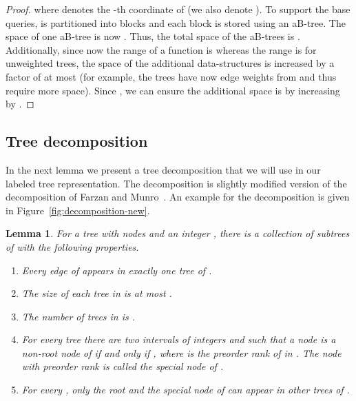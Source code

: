 \documentclass[12pt]{article}
\newtheorem{lemma}[theorem]{Lemma}
\begin{document}
\begin{proof}
where  denotes the -th coordinate of 
(we also denote ).
To support the base queries,  is partitioned into blocks and each block
is stored using an aB-tree.
The space of one aB-tree is now .
Thus, the total space of the aB-trees is .
Additionally, since now the range of a function  is 
whereas the range is  for unweighted trees,
the space of the additional data-structures is increased
by a factor of at most 
(for example, the  trees have now edge weights from 
and thus require more space).
Since , we can ensure the additional space is 
by increasing  by .
\end{proof}

\subsection{Tree decomposition}
In the next lemma we present a tree decomposition that we will use in
our labeled tree representation.
The decomposition is slightly modified version of the decomposition of
Farzan and Munro~\cite{FarzanM08}.
An example for the decomposition is given in Figure~\ref{fig:decomposition-new}.
\begin{lemma}\label{lem:tree-cover}
For a tree  with  nodes and an integer , there is a collection
 of subtrees of  with
the following properties.
\begin{enumerate}
\item\label{enum:cover}
Every edge of  appears in exactly one tree of .
\item\label{enum:size}
The size of each tree in  is at most .
\item\label{enum:number}
The number of trees in  is .
\item\label{enum:interval}
For every tree  there are two intervals of integers
 and  such that a node  is
a non-root node of  if and only if ,
where  is the preorder rank of  in .
The node with preorder rank 
is called the \emph{special node} of .
\item\label{enum:special}
For every , only the root and the special node of 
can appear in other trees of .
\end{enumerate}
\end{lemma}
\end{document}
